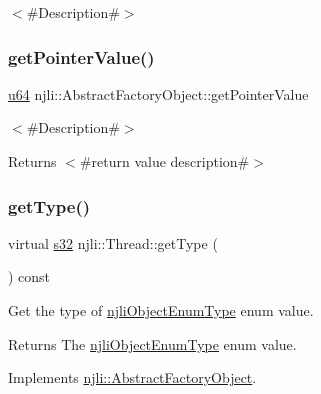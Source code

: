 $<$\#\+Description\#$>$ \mbox{\label{classnjli_1_1_thread_a4ffddf141a426a5a07d0ac19f1913811}} 
\subsubsection{\texorpdfstring{get\+Pointer\+Value()}{getPointerValue()}}
{\footnotesize\ttfamily \mbox{\hyperlink{_util_8h_ad758b7a5c3f18ed79d2fcd23d9f16357}{u64}} njli\+::\+Abstract\+Factory\+Object\+::get\+Pointer\+Value}

$<$\#\+Description\#$>$

\begin{DoxyReturn}{Returns}
$<$\#return value description\#$>$ 
\end{DoxyReturn}
\mbox{\label{classnjli_1_1_thread_a38cbb608d012da083fd9d35ed87ba277}} 
\subsubsection{\texorpdfstring{get\+Type()}{getType()}}
{\footnotesize\ttfamily virtual \mbox{\hyperlink{_util_8h_aa62c75d314a0d1f37f79c4b73b2292e2}{s32}} njli\+::\+Thread\+::get\+Type (\begin{DoxyParamCaption}{ }\end{DoxyParamCaption}) const\hspace{0.3cm}{\ttfamily [virtual]}}

Get the type of \mbox{\hyperlink{namespacenjli_a6d56d4fbaf89fcf3e3d32839df05b444}{njli\+Object\+Enum\+Type}} enum value.

\begin{DoxyReturn}{Returns}
The \mbox{\hyperlink{namespacenjli_a6d56d4fbaf89fcf3e3d32839df05b444}{njli\+Object\+Enum\+Type}} enum value. 
\end{DoxyReturn}


Implements \mbox{\hyperlink{classnjli_1_1_abstract_factory_object_a207c86146d40d0794708ae7f2d4e60a7}{njli\+::\+Abstract\+Factory\+Object}}.

\mbox{\label{classnjli_1_1_thread_ab0d4353d5fbca34da213eb4cbeb8bfe3}} 
